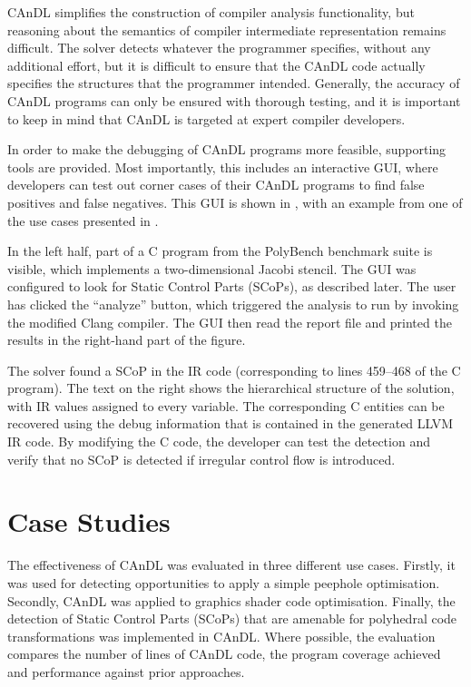     CAnDL simplifies the construction of compiler analysis functionality, but
    reasoning about the semantics of compiler intermediate representation
    remains difficult.
    The solver detects whatever the programmer specifies, without any additional
    effort, but it is difficult to ensure that the CAnDL code actually
    specifies the structures that the programmer intended.
    Generally, the accuracy of CAnDL programs can only be ensured with
    thorough testing, and it is important to keep in mind that CAnDL is targeted
    at expert compiler developers.

    In order to make the debugging of CAnDL programs more feasible, 
    supporting tools are provided.
    Most importantly, this includes an interactive GUI, where developers can
    test out corner cases of their CAnDL programs to find false positives and
    false negatives.
    This GUI is shown in , with an example from one of the use
    cases presented in .

    In the left half, part of a C program from the PolyBench benchmark suite
    is visible, which implements a two-dimensional Jacobi stencil.
    The GUI was configured to look for Static Control Parts (SCoPs), as
    described later.
    The user has clicked the ``analyze'' button, which triggered the analysis to
    run by invoking the modified Clang compiler.
    The GUI then read the report file and printed the results in the right-hand
    part of the figure.

    The solver found a SCoP in the IR code (corresponding to lines 459--468 of
    the C program).
    The text on the right shows the hierarchical structure of the solution, with
    IR values assigned to every variable.
    The corresponding C entities can be recovered using the debug information
    that is contained in the generated LLVM IR code.
    By modifying the C code, the developer can test the detection and verify
    that no SCoP is detected if irregular control flow is introduced.

\section{Case Studies}
\label{sec:casestudies}

    The effectiveness of CAnDL was evaluated in three different use cases.
    Firstly, it was used for detecting opportunities to apply a simple peephole
    optimisation.
    Secondly, CAnDL was applied to graphics shader code optimisation.
    Finally, the detection of Static Control Parts (SCoPs) that are
    amenable for polyhedral code transformations was implemented in CAnDL.
    Where possible, the evaluation compares the number of lines of CAnDL code,
    the program coverage achieved and performance against prior approaches.

